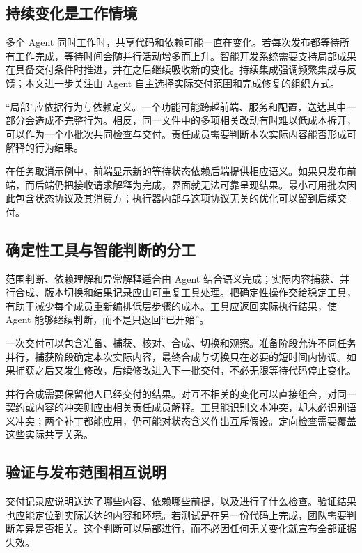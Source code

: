 \label{sec:delivery}
\subsection{持续变化是工作情境}
多个 Agent 同时工作时，共享代码和依赖可能一直在变化。若每次发布都等待所有工作完成，等待时间会随并行活动增多而上升。智能开发系统需要支持局部成果在具备交付条件时推进，并在之后继续吸收新的变化。持续集成强调频繁集成与反馈\cite{fowlerci}；本文进一步关注由 Agent 自主选择实际交付范围和完成修复的组织方式。

“局部”应依据行为与依赖定义。一个功能可能跨越前端、服务和配置，送达其中一部分会造成不完整行为。相反，同一文件中的多项相关改动有时难以低成本拆开，可以作为一个小批次共同检查与交付。责任成员需要判断本次实际内容能否形成可解释的行为结果。

在任务取消示例中，前端显示新的等待状态依赖后端提供相应语义。如果只发布前端，而后端仍把接收请求解释为完成，界面就无法可靠呈现结果。最小可用批次因此包含状态协议及其消费方；执行器内部与这项协议无关的优化可以留到后续交付。

\subsection{确定性工具与智能判断的分工}
范围判断、依赖理解和异常解释适合由 Agent 结合语义完成；实际内容捕获、并行合成、版本切换和结果记录应由可重复工具处理。把确定性操作交给稳定工具，有助于减少每个成员重新编排低层步骤的成本。工具应返回实际执行结果，使 Agent 能够继续判断，而不是只返回“已开始”。

一次交付可以包含准备、捕获、核对、合成、切换和观察。准备阶段允许不同任务并行，捕获阶段确定本次实际内容，最终合成与切换只在必要的短时间内协调。如果捕获之后又发生修改，后续修改进入下一批交付，不必无限等待代码停止变化。

并行合成需要保留他人已经交付的结果。对互不相关的变化可以直接组合，对同一契约或内容的冲突则应由相关责任成员解释。工具能识别文本冲突，却未必识别语义冲突；两个补丁都能应用，仍可能对状态含义作出互斥假设。定向检查需要覆盖这些实际共享关系。


\subsection{验证与发布范围相互说明}
交付记录应说明送达了哪些内容、依赖哪些前提，以及进行了什么检查。验证结果也应能定位到实际送达的内容和环境。若测试是在另一份代码上完成，团队需要判断差异是否相关。这个判断可以局部进行，而不必因任何无关变化就宣布全部证据失效。

